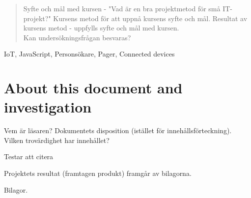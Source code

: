 
\begin{abstract}
Syfte och mål med kursen - "Vad är en bra projektmetod för små IT-projekt?" Kursens metod för att uppnå
kursens syfte och mål. Resultat av kursens metod - uppfylls syfte och mål med kursen.\\
Kan undersökningsfrågan besvaras?
\end{abstract}

\begin{IEEEkeywords}
IoT, JavaScript, Personsökare, Pager, Connected devices
\end{IEEEkeywords}

\section{About this document and investigation}
Vem är läsaren? Dokumentets disposition (istället för innehållsförteckning). Vilken trovärdighet har innehållet?

Testar att citera \cite{eklund_arbeta_2010}

Projektets resultat (framtagen produkt) framgår av bilagorna.

Bilagor.